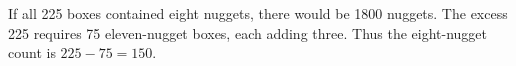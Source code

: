 If all 225 boxes contained eight nuggets, there would be 1800 nuggets. The excess 225 requires 75 eleven-nugget boxes, each adding three. Thus the eight-nugget count is $225-75=\boxed{150}$.
